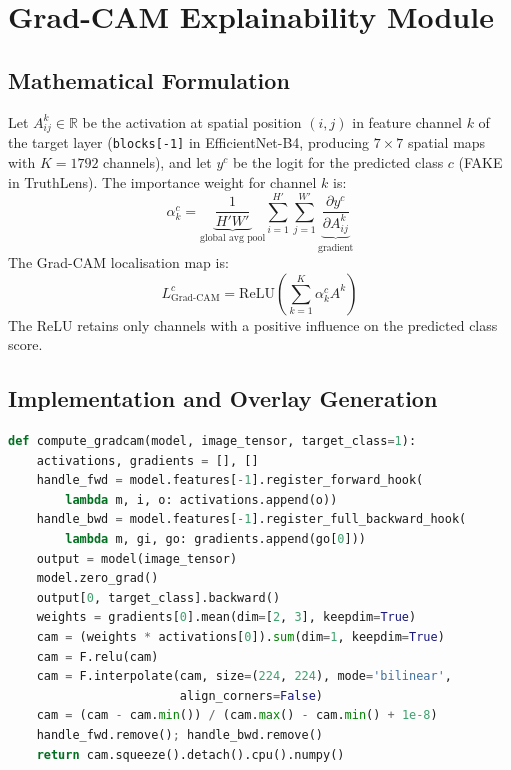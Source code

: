 \documentclass[12pt,a4paper,oneside]{report}
\begin{document}
\section{Grad-CAM Explainability Module}
\label{sec:gradcam_impl}

\subsection{Mathematical Formulation}

Let $A^k_{ij} \in \mathbb{R}$ be the activation at spatial position $(i,j)$ in
feature channel $k$ of the target layer (\texttt{blocks[-1]} in EfficientNet-B4,
producing $7\times7$ spatial maps with $K=1792$ channels), and let $y^c$ be the
logit for the predicted class $c$ (FAKE in TruthLens). The importance weight for
channel $k$ is:
\[
  \alpha_k^c = \underbrace{\frac{1}{H'W'}}_{\text{global avg pool}}
  \sum_{i=1}^{H'}\sum_{j=1}^{W'}
  \underbrace{\frac{\partial y^c}{\partial A^k_{ij}}}_{\text{gradient}}
\]
The Grad-CAM localisation map is:
\[
  L^c_{\text{Grad-CAM}} = \mathrm{ReLU}\!\left(\sum_{k=1}^{K} \alpha_k^c A^k\right)
\]
The ReLU retains only channels with a positive influence on the predicted class score.

\subsection{Implementation and Overlay Generation}

\begin{lstlisting}[language=Python, caption={Grad-CAM computation in TruthLens (gradcam.py)}, aboveskip=6pt, belowskip=6pt, captionpos=b]
def compute_gradcam(model, image_tensor, target_class=1):
    activations, gradients = [], []
    handle_fwd = model.features[-1].register_forward_hook(
        lambda m, i, o: activations.append(o))
    handle_bwd = model.features[-1].register_full_backward_hook(
        lambda m, gi, go: gradients.append(go[0]))
    output = model(image_tensor)
    model.zero_grad()
    output[0, target_class].backward()
    weights = gradients[0].mean(dim=[2, 3], keepdim=True)
    cam = (weights * activations[0]).sum(dim=1, keepdim=True)
    cam = F.relu(cam)
    cam = F.interpolate(cam, size=(224, 224), mode='bilinear',
                        align_corners=False)
    cam = (cam - cam.min()) / (cam.max() - cam.min() + 1e-8)
    handle_fwd.remove(); handle_bwd.remove()
    return cam.squeeze().detach().cpu().numpy()
\end{lstlisting}
\end{document}
